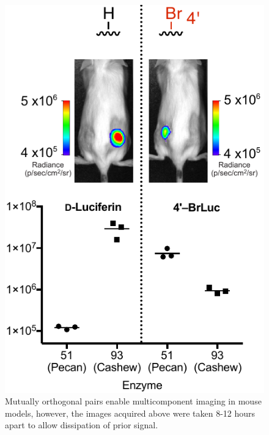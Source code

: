\documentclass{F32}
\begin{document}
\begin{figure}
\begin{centering}
\includegraphics[width=\textwidth]{Previous_Research_figs/mouse1pc.pdf}

\end{centering}
\footnotesize
\caption{\label{figure:mice}
Mutually orthogonal pairs enable multicomponent imaging in mouse models, however, the images acquired above were taken 8-12 hours apart to allow dissipation of prior signal.
}
\end{figure}
\end{document}
